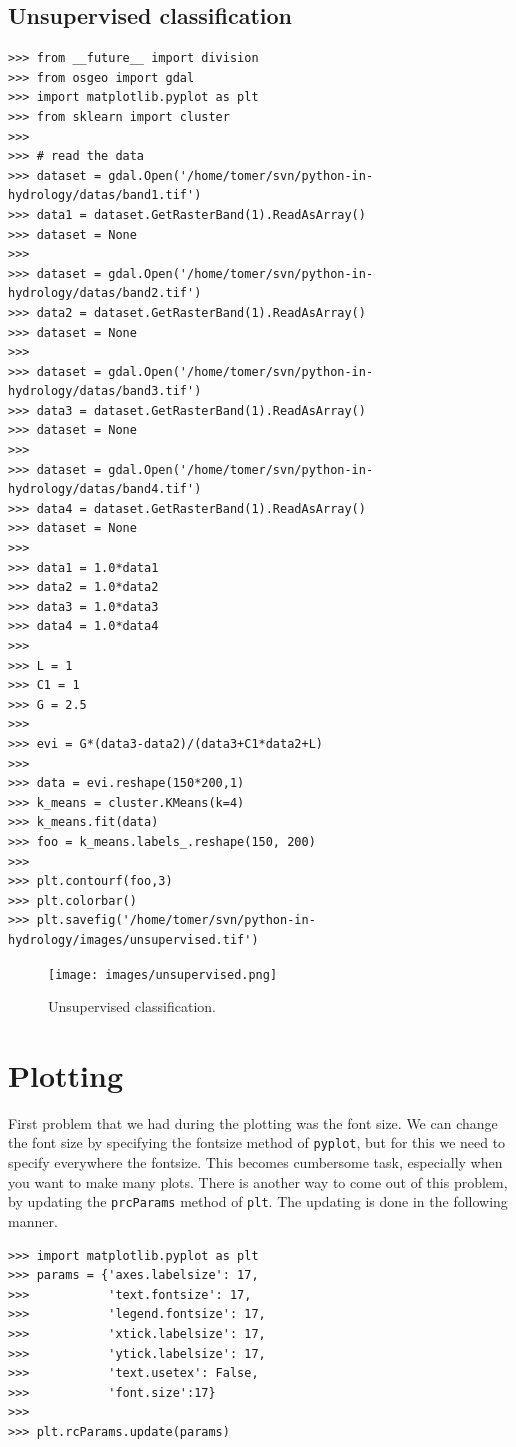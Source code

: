 \documentclass[10pt]{book}
\begin{document}
\section{Unsupervised classification}
\beforeverb \begin{verbatim}
>>> from __future__ import division
>>> from osgeo import gdal
>>> import matplotlib.pyplot as plt
>>> from sklearn import cluster
>>> 
>>> # read the data
>>> dataset = gdal.Open('/home/tomer/svn/python-in-hydrology/datas/band1.tif')
>>> data1 = dataset.GetRasterBand(1).ReadAsArray()
>>> dataset = None
>>> 
>>> dataset = gdal.Open('/home/tomer/svn/python-in-hydrology/datas/band2.tif')
>>> data2 = dataset.GetRasterBand(1).ReadAsArray()
>>> dataset = None
>>> 
>>> dataset = gdal.Open('/home/tomer/svn/python-in-hydrology/datas/band3.tif')
>>> data3 = dataset.GetRasterBand(1).ReadAsArray()
>>> dataset = None
>>> 
>>> dataset = gdal.Open('/home/tomer/svn/python-in-hydrology/datas/band4.tif')
>>> data4 = dataset.GetRasterBand(1).ReadAsArray()
>>> dataset = None
>>> 
>>> data1 = 1.0*data1
>>> data2 = 1.0*data2
>>> data3 = 1.0*data3
>>> data4 = 1.0*data4
>>> 
>>> L = 1
>>> C1 = 1
>>> G = 2.5
>>> 
>>> evi = G*(data3-data2)/(data3+C1*data2+L)
>>> 
>>> data = evi.reshape(150*200,1)
>>> k_means = cluster.KMeans(k=4)
>>> k_means.fit(data) 
>>> foo = k_means.labels_.reshape(150, 200)
>>> 
>>> plt.contourf(foo,3)
>>> plt.colorbar()
>>> plt.savefig('/home/tomer/svn/python-in-hydrology/images/unsupervised.tif')
\end{verbatim} \afterverb

\beforefig
\begin{figure}[h!]
  \centering
    \texttt{[image: images/unsupervised.png]}
  \caption{Unsupervised classification.}
   \label{fig:unsuper}
\end{figure}
\afterfig


\chapter{Plotting}
First problem that we had during the plotting was the font size. We can change the font size by specifying the fontsize method of \verb"pyplot", but for this we need to specify everywhere the fontsize. This becomes cumbersome task, especially when you want to make many plots. There is another way to come out of this problem, by updating the \verb"prcParams" method of \verb"plt". The updating is done in the following manner. 

\beforeverb
\begin{verbatim}
>>> import matplotlib.pyplot as plt
>>> params = {'axes.labelsize': 17, 
>>>           'text.fontsize': 17,
>>>           'legend.fontsize': 17,
>>>           'xtick.labelsize': 17,
>>>           'ytick.labelsize': 17,
>>>           'text.usetex': False,
>>>           'font.size':17}
>>> 
>>> plt.rcParams.update(params)
\end{verbatim}
\afterverb
{}
\end{document}
